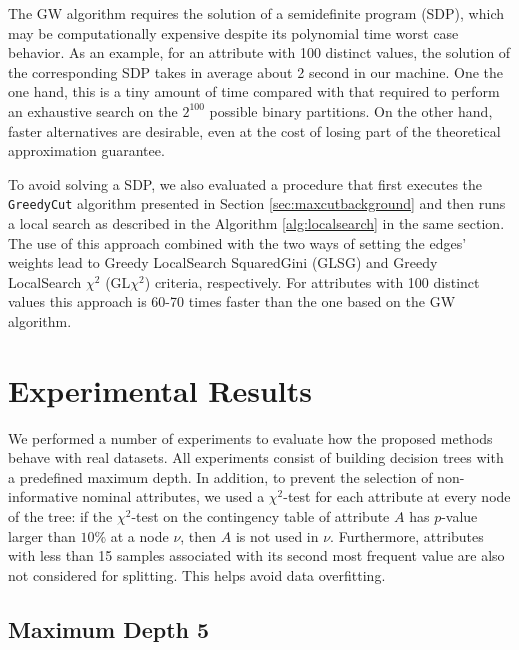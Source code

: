 The GW algorithm  requires  the solution of a semidefinite program (SDP),
which may be computationally expensive despite  its 
polynomial time worst case  behavior.
As an example, for an attribute with 100 distinct values, the solution of
the corresponding SDP takes in average about 2 second in our machine.
One the one hand, this is a tiny amount of time 
compared with that required to perform an exhaustive search on the $2^{100}$
possible binary partitions. On the other hand, 
 faster alternatives are desirable, even
at the cost of losing part of the theoretical approximation guarantee. 

To avoid solving a SDP, 
we also evaluated a procedure
that first executes the {\tt GreedyCut} algorithm presented
in Section \ref{sec:maxcutbackground} and then runs a local search as described
in the Algorithm  \ref{alg:localsearch} in the same section. 
The use of this approach combined with the two
ways of setting the edges' weights lead to
 Greedy LocalSearch SquaredGini (GLSG) and 
Greedy LocalSearch $\chi^2$ (GL$\chi^2$) 
criteria, respectively.
For attributes with 100 distinct values this approach is 60-70
times faster than the one based on the GW algorithm.


\section{Experimental Results}

We performed a number of experiments to evaluate how the
proposed methods behave with real datasets.
All experiments consist of building decision trees
with a predefined maximum depth.  In addition,
to prevent the selection of non-informative nominal attributes, 
we used a $\chi^2$-test for each attribute at every node of
the tree: if the $\chi^2$-test  on the contingency table of attribute $A$
has $p$-value larger than $10\%$ at a node $\nu$, then
$A$ is not used in $\nu$. Furthermore, attributes with less than 15 samples associated with its
second most frequent value are also not considered for splitting. This helps  avoid data overfitting.


\subsection{Maximum Depth 5}

